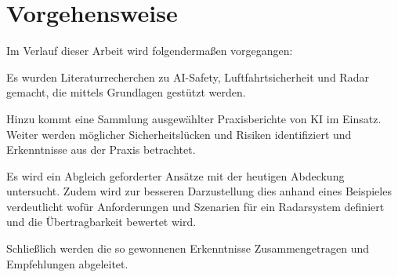\section{Vorgehensweise}
Im Verlauf dieser Arbeit wird folgendermaßen vorgegangen:

\medskip
Es wurden Literaturrecherchen zu AI-Safety, Luftfahrtsicherheit und Radar gemacht, 
die mittels Grundlagen gestützt werden. 

Hinzu kommt eine Sammlung ausgewählter Praxisberichte von KI im Einsatz. Weiter werden 
möglicher Sicherheitslücken und Risiken identifiziert und Erkenntnisse aus der Praxis betrachtet.

Es wird ein Abgleich geforderter Ansätze mit der heutigen Abdeckung untersucht. 
Zudem wird zur besseren Darzustellung dies anhand eines Beispieles verdeutlicht wofür
Anforderungen und Szenarien für ein Radarsystem definiert und die Übertragbarkeit bewertet wird.

Schließlich werden die so gewonnenen Erkenntnisse Zusammengetragen und Empfehlungen abgeleitet.



